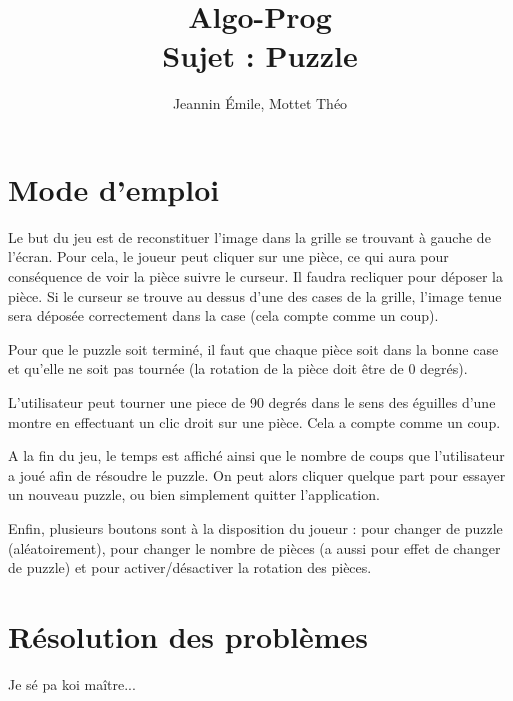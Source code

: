 \documentclass[]{article}
\title{Algo-Prog\\Sujet \no2 : Puzzle}
\author{Jeannin Émile, Mottet Théo}
\begin{document}
\maketitle

\section{Mode d'emploi}

Le but du jeu est de reconstituer l'image dans la grille se trouvant à gauche de l'écran. Pour cela, le joueur peut cliquer sur une pièce, ce qui aura pour conséquence de voir la pièce suivre le curseur. Il faudra recliquer pour déposer la pièce. Si le curseur se trouve au dessus d'une des cases de la grille, l'image tenue sera déposée correctement dans la case (cela compte comme un coup).

Pour que le puzzle soit terminé, il faut que chaque pièce soit dans la bonne case et qu'elle ne soit pas tournée (la rotation de la pièce doit être de 0 degrés).

L'utilisateur peut tourner une piece de 90 degrés dans le sens des éguilles d'une montre en effectuant un clic droit sur une pièce. Cela a compte comme un coup.

A la fin du jeu, le temps est affiché ainsi que le nombre de coups que l'utilisateur a joué afin de résoudre le puzzle. On peut alors cliquer quelque part pour essayer un nouveau puzzle, ou bien simplement quitter l'application.

Enfin, plusieurs boutons sont à la disposition du joueur : pour changer de puzzle (aléatoirement), pour changer le nombre de pièces (a aussi pour effet de changer de puzzle) et pour activer/désactiver la rotation des pièces.

\section{Résolution des problèmes}

Je sé pa koi maître...
\end{document}
